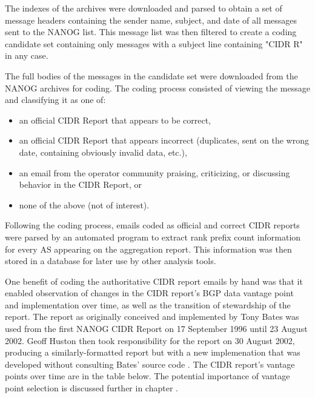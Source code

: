 The indexes of the archives were downloaded and parsed to obtain a set of message headers containing the sender name, subject, and date of all messages sent to the NANOG list. This message list was then filtered to create a coding candidate set containing only messages with a subject line containing "CIDR R" in any case.

The full bodies of the messages in the candidate set were downloaded from the NANOG archives for coding. The coding process consisted of viewing the message and classifying it as one of:

\begin{itemize}
\item{an official CIDR Report that appears to be correct,}
\item{an official CIDR Report that appears incorrect (duplicates, sent on the wrong date, containing obviously invalid data, etc.),}
\item{an email from the operator community praising, criticizing, or discussing behavior in the CIDR Report, or}
\item{none of the above (not of interest).}
\end{itemize}

Following the coding process, emails coded as official and correct CIDR reports were parsed by an automated program to extract rank prefix count information for every AS appearing on the aggregation report. This information was then stored in a database for later use by other analysis tools.

One benefit of coding the authoritative CIDR report emails by hand was that it enabled observation of changes in the CIDR report's BGP data vantage point and implementation over time, as well as the transition of stewardship of the report. The report as originally conceived and implemented by Tony Bates was used from the first NANOG CIDR Report on 17 September 1996 until 23 August 2002. Geoff Huston then took responsibility for the report on 30 August 2002, producing a similarly-formatted report but with a new implemenation that was developed without consulting Bates' source code \cite{Huston interview}. The CIDR report's vantage points over time are in the table below. The potential importance of vantage point selection is discussed further in chapter .

